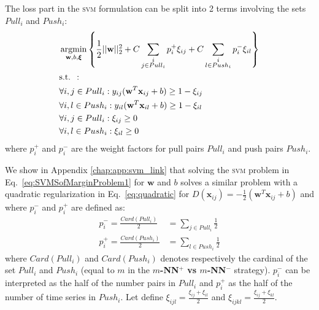 \newpage
\noindent The loss part in the \textsc{svm} formulation can be split into 2 terms involving the sets $Pull_i$ and $Push_i$:
\begin{equation}
\begin{aligned}
&\displaystyle \argmin_{\textbf{w},b,\boldsymbol{\xi}} 
\left\lbrace \frac{1}{2}||\textbf{w}||_2^2
+ C \sum\limits_{\substack{i \\j \in Pull_i}}p_i^+\xi_{ij}
+ C \sum\limits_{\substack{i \\l \in Push_i}}p_i^-\xi_{il} \right\rbrace \\
& \text{s.t.  }: \\
& \forall i,j \in Pull_i: y_{ij}(\textbf{w}^T\textbf{x}_{ij}+b) \geq 1-\xi_{ij}\\
& \forall i,l \in Push_i: y_{il}(\textbf{w}^T\textbf{x}_{il}+b) \geq 1-\xi_{il}\\
& \forall i,j \in Pull_i: \xi_{ij} \geq 0 \\
& \forall i,l \in Push_i: \xi_{il} \geq 0
\end{aligned}
\label{eq:SVMSofMarginProblem1}
\end{equation}
\noindent where $p_i^+$ and $p_i^-$ are the weight factors for pull pairs $Pull_i$ and push pairs $Push_i$. 

\noindent We show in Appendix \ref{chap:app:svm_link} that solving the \textsc{svm} problem in Eq.~\ref{eq:SVMSofMarginProblem1} for $\textbf{w}$ and $b$ solves a similar problem with a quadratic regularization in Eq.~\ref{eq:quadratic} for $D(\textbf{x}_{ij})=-\frac{1}{2}(\textbf{w}^T\textbf{x}_{ij}+b)$ and where $p_i^-$ and $p_i^+$ are defined as:
\begin{align}
	p_i^- = \frac{Card(Pull_i)}{2} & = \sum_{j \in Pull_i} \frac{1}{2} \label{eq:pi_plus}\\
	p_i^+ = \frac{Card(Push_i)}{2} & = \sum_{l \in Push_i} \frac{1}{2} \label{eq:pi_moins}
\end{align}
\noindent where $Card(Pull_i)$ and $Card(Push_i)$ denotes respectively the cardinal of the set $Pull_i$ and $Push_i$ (equal to $m$ in the \textbf{$m$-NN$^+$ vs $m$-NN$^-$} strategy). $p_i^-$ can be interpreted as the half of the number pairs in $Pull_i$ and $p_i^+$ as the half of the number of time series in $Push_i$. Let define $\xi_{ijl}=\frac{\xi_{ij}+\xi_{il}}{2}$ and $\xi_{ijkl}=\frac{\xi_{ij}+\xi_{kl}}{2}$.


